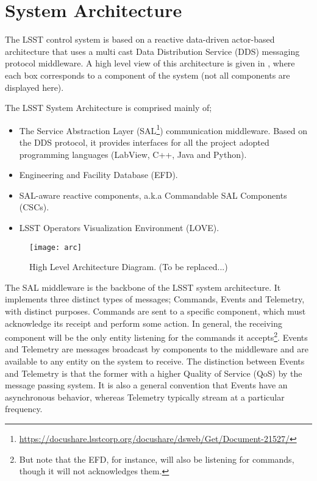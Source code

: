 \section{System Architecture} \label{sec:sysarc}


The LSST control system is based on a reactive data-driven actor-based architecture that uses a multi cast Data Distribution Service (DDS) messaging protocol middleware. A high level view of this architecture is given in , where each box corresponds to a component of the system (not all components are displayed here).

The LSST System Architecture is comprised mainly of;
%
\begin{itemize}
\item The Service Abstraction Layer (SAL\footnote{\url{https://docushare.lsstcorp.org/docushare/dsweb/Get/Document-21527/}}) communication middleware. Based on the DDS protocol, it provides interfaces for all the project adopted programming languages (LabView, C++, Java and Python).
\item Engineering and Facility Database (EFD).
\item SAL-aware reactive components, a.k.a Commandable SAL Components (CSCs).
\item LSST Operators Visualization Environment (LOVE).
\end{itemize}

\begin{figure}
\begin{center}
\texttt{[image: arc]}
\caption{High Level Architecture Diagram. (To be replaced...)\label{fig:arc}}
\end{center}
\end{figure}

The SAL middleware is the backbone of the LSST system architecture. It implements three distinct types of messages; Commands, Events and Telemetry, with distinct purposes. Commands are sent to a specific component, which must acknowledge its receipt and perform some action. In general, the receiving component will be the only entity listening for the commands it accepts\footnote{But note that the EFD, for instance, will also be listening for commands, though it will not acknowledges them.}. Events and Telemetry are messages broadcast by components to the middleware and are available to any entity on the system to receive. The distinction between Events and Telemetry is that the former with a higher Quality of Service (QoS) by the message passing system. It is also a general convention that Events have an asynchronous behavior, whereas Telemetry typically stream at a particular frequency.


